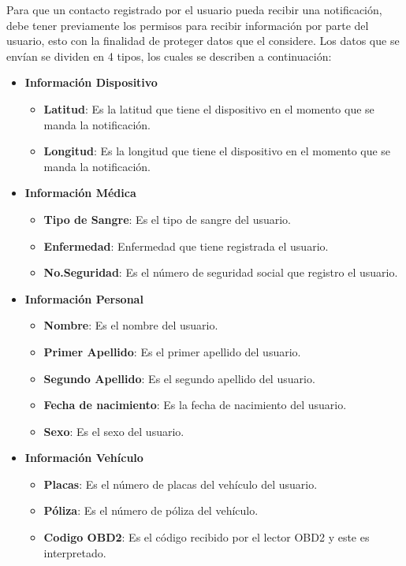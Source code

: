 Para que un contacto registrado por el usuario pueda recibir una notificación, debe tener previamente los permisos para recibir información por parte del usuario, esto con la finalidad de proteger datos que el considere. Los datos que se envían se dividen en 4 tipos, los cuales se describen a continuación:

\begin{itemize}
	\item \textbf{Información Dispositivo}
	\begin{itemize}
		\item \textbf{Latitud}: Es la latitud que tiene el dispositivo en el momento que se manda la notificación.
		\item \textbf{Longitud}: Es la longitud que tiene el dispositivo en el momento que se manda la notificación.
	\end{itemize}

	\item \textbf{Información Médica}
	
	\begin{itemize}
		\item \textbf{Tipo de Sangre}: Es el tipo de sangre del usuario.
		\item \textbf{Enfermedad}: Enfermedad que tiene registrada el usuario.
		\item \textbf{No.Seguridad}: Es el número de seguridad social que registro el usuario.
	\end{itemize}

	\item \textbf{Información Personal}
	
	 \begin{itemize}
	 	\item \textbf{Nombre}: Es el nombre del usuario.
	 	\item \textbf{Primer Apellido}: Es el primer apellido del usuario.
	 	\item \textbf{Segundo Apellido}: Es el segundo apellido del usuario.
	 	\item \textbf{Fecha de nacimiento}: Es la fecha de nacimiento del usuario.
	 	\item \textbf{Sexo}: Es el sexo del usuario.
	 \end{itemize}
 
 	\item \textbf{Información Vehículo}
 	
 	\begin{itemize}
 		\item \textbf{Placas}: Es el número de placas del vehículo del usuario.
 		\item \textbf{Póliza}: Es el número de póliza del vehículo.
 		\item \textbf{Codigo OBD2}: Es el código recibido por el lector OBD2 y este es interpretado.
 	\end{itemize}
	
\end{itemize}

